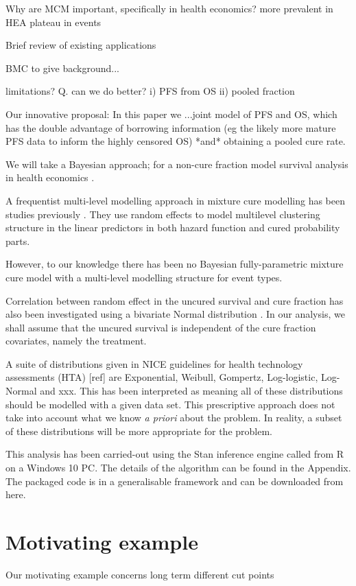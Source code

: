 \documentclass[AMA,STIX1COL]{WileyNJD-v2}
\begin{document}
Why are MCM important, specifically in health economics?
more prevalent in HEA
plateau in events

Brief review of existing applications


BMC to give background...

limitations?
Q. can we do better?
i) PFS from OS
ii) pooled fraction

Our innovative proposal:
In this paper we ...joint model of PFS and OS, which has the double advantage of borrowing information
(eg the likely more mature PFS data to inform the highly censored OS)
*and* obtaining a pooled cure rate.

We will take a Bayesian approach; for a non-cure fraction model survival analysis in health economics \cite{Demiris2006,Jackson2010}.

A frequentist multi-level modelling approach in mixture cure modelling has been studies previously \cite{Lai2009}.
They use random effects to model multilevel clustering structure in the linear predictors in both hazard function and cured probability parts.

However, to our knowledge there has been no Bayesian fully-parametric mixture cure model with a multi-level modelling structure for event types.

Correlation between random effect in the uncured survival and cure fraction has also been investigated using a bivariate Normal distribution \cite{Lai2008}.
In our analysis, we shall assume that the uncured survival is independent of the cure fraction covariates, namely the treatment.

A suite of distributions given in NICE guidelines for health technology assessments (HTA) [ref] are
Exponential, Weibull, Gompertz, Log-logistic, Log-Normal and xxx.
This has been interpreted as meaning all of these distributions should be modelled with a given data set.
This prescriptive approach does not take into account what we know {\it a priori} about the problem.
In reality, a subset of these distributions will be more appropriate for the problem.

This analysis has been carried-out using the Stan inference engine
\cite{carpenter2017stan} called from R \cite{Rcoreteam} on a Windows 10 PC.
The details of the algorithm can be found in the Appendix.
The packaged code is in a generalisable framework and can be downloaded from here.


\section{Motivating example}\label{sec:example}
Our motivating example concerns
long term
different cut points
\end{document}
